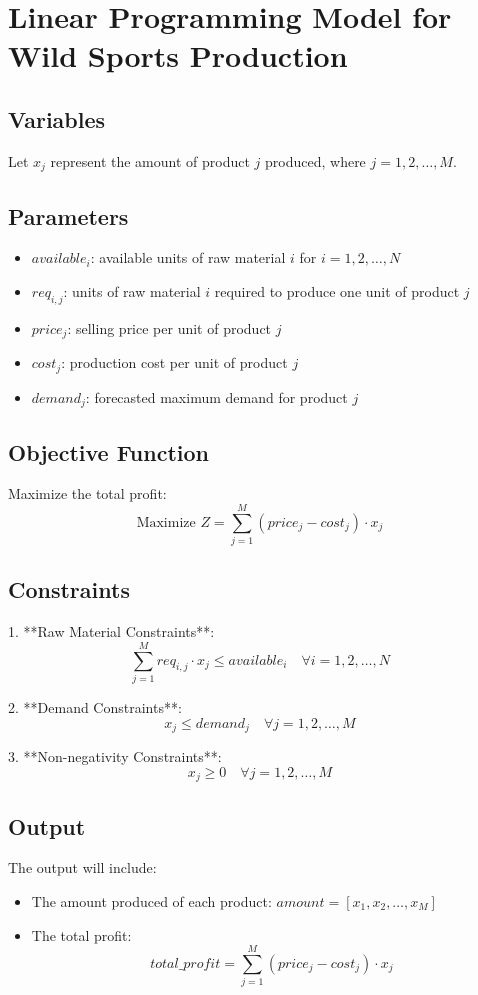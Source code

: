 \documentclass{article}
\begin{document}
\section*{Linear Programming Model for Wild Sports Production}

\subsection*{Variables}
Let \( x_j \) represent the amount of product \( j \) produced, where \( j = 1, 2, \ldots, M \).

\subsection*{Parameters}
\begin{itemize}
    \item \( available_i \): available units of raw material \( i \) for \( i = 1, 2, \ldots, N \)
    \item \( req_{i,j} \): units of raw material \( i \) required to produce one unit of product \( j \)
    \item \( price_j \): selling price per unit of product \( j \)
    \item \( cost_j \): production cost per unit of product \( j \)
    \item \( demand_j \): forecasted maximum demand for product \( j \)
\end{itemize}

\subsection*{Objective Function}
Maximize the total profit:
\[
\text{Maximize } Z = \sum_{j=1}^{M} (price_j - cost_j) \cdot x_j
\]

\subsection*{Constraints}
1. **Raw Material Constraints**:
\[
\sum_{j=1}^{M} req_{i,j} \cdot x_j \leq available_i \quad \forall i = 1, 2, \ldots, N
\]

2. **Demand Constraints**:
\[
x_j \leq demand_j \quad \forall j = 1, 2, \ldots, M
\]

3. **Non-negativity Constraints**:
\[
x_j \geq 0 \quad \forall j = 1, 2, \ldots, M
\]

\subsection*{Output}
The output will include:
\begin{itemize}
    \item The amount produced of each product: \( amount = [x_1, x_2, \ldots, x_M] \)
    \item The total profit: 
    \[
    total\_profit = \sum_{j=1}^{M} (price_j - cost_j) \cdot x_j
    \]
\end{itemize}
\end{document}
